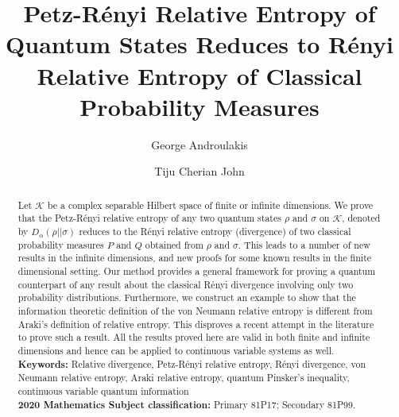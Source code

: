 \documentclass[12pt,a4paper,oneside]{article}
\title{Petz-R\'enyi Relative Entropy of Quantum States  Reduces to R\'enyi Relative Entropy of Classical Probability Measures}
\author[1]{George Androulakis}
\author[2]{Tiju Cherian John}
\affil[1,2]{University of South Carolina, Columbia, South Carolina, USA \emailaddress{giorgis@math.sc.edu, tijucherian@fulbrightmail.org}}
\numberwithin{equation}{section}
\theoremstyle{definition}  %
\theoremstyle{plain}  %
\theoremstyle{remark} %
\begin{document}
\maketitle
\tableofcontents
\newpage
 \begin{abstract}
Let $\mathcal{K}$ be a complex separable Hilbert space of finite or infinite dimensions. We prove that the Petz-R\'enyi relative entropy of any two quantum states $\rho$ and $\sigma$ on $\mathcal{K}$, denoted by $D_{\alpha}(\rho||\sigma)$ reduces to the R\'enyi relative entropy (divergence) of two classical probability measures $P$ and $Q$ obtained from $\rho$ and $\sigma$. This leads to a number of new results in the infinite dimensions,  and new proofs for some known results in the finite dimensional setting. Our method provides a general framework for proving a quantum counterpart of any result about the classical R\'enyi divergence involving only two probability distributions.  Furthermore, we construct an example to show that the information theoretic definition of the von Neumann relative entropy is different from Araki's definition of relative entropy. This disproves a recent attempt in the literature to prove  such a result. 
All the results proved here  are valid in both finite and infinite dimensions and hence can be applied to continuous variable systems as well.\\ 
   \textbf{Keywords:}  Relative divergence, Petz-R\'enyi relative entropy, R\'enyi divergence, von Neumann relative entropy, Araki relative entropy, quantum Pinsker's inequality, continuous variable quantum information\\
 \textbf{2020 Mathematics Subject classification:}
 Primary 81P17; Secondary 81P99.
 \end{abstract}
 
 
\end{document}
